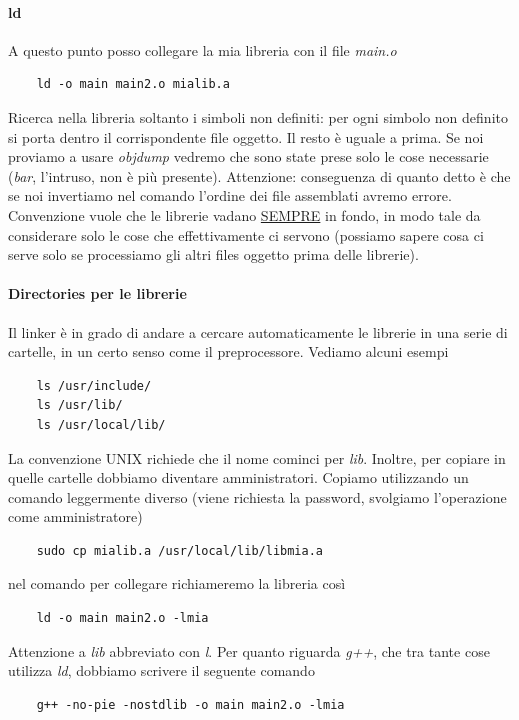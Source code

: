 \paragraph{ld} A questo punto posso collegare la mia libreria con il file \emph{main.o}
\begin{verbatim}
	ld -o main main2.o mialib.a
\end{verbatim}
Ricerca nella libreria soltanto i simboli non definiti: per ogni simbolo non definito si porta dentro il corrispondente file oggetto. Il resto è uguale a prima. Se noi proviamo a usare \emph{objdump} vedremo che sono state prese solo le cose necessarie (\emph{bar}, l'intruso, non è più presente). Attenzione: conseguenza di quanto detto è che se noi invertiamo nel comando l'ordine dei file assemblati avremo errore. Convenzione vuole che le librerie vadano \underline{SEMPRE} in fondo, in modo tale da considerare solo le cose che effettivamente ci servono (possiamo sapere cosa ci serve solo se processiamo gli altri files oggetto prima delle librerie).
\paragraph{Directories per le librerie} Il linker è in grado di andare a cercare automaticamente le librerie in una serie di cartelle, in un certo senso come il preprocessore. Vediamo alcuni esempi
\begin{verbatim}
	ls /usr/include/
	ls /usr/lib/
	ls /usr/local/lib/
\end{verbatim}
La convenzione UNIX richiede che il nome cominci per \emph{lib}. Inoltre, per copiare in quelle cartelle dobbiamo diventare amministratori. Copiamo utilizzando un comando leggermente diverso (viene richiesta la password, svolgiamo l'operazione come amministratore)
\begin{verbatim}
	sudo cp mialib.a /usr/local/lib/libmia.a
\end{verbatim}
nel comando per collegare richiameremo la libreria così
\begin{verbatim}
	ld -o main main2.o -lmia
\end{verbatim}
Attenzione a \emph{lib} abbreviato con \emph{l}. Per quanto riguarda \emph{g++}, che tra tante cose utilizza \emph{ld}, dobbiamo scrivere il seguente comando
\begin{verbatim}
	g++ -no-pie -nostdlib -o main main2.o -lmia
\end{verbatim}
